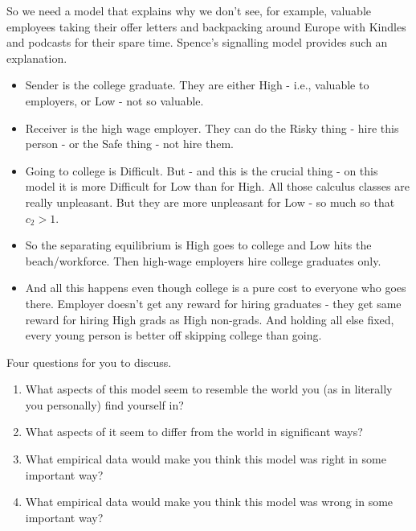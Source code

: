 \documentclass[11pt,]{article}
\providecommand{\tightlist}{%
  \setlength{\itemsep}{0pt}\setlength{\parskip}{0pt}}
\begin{document}
So we need a model that explains why we don't see, for example, valuable
employees taking their offer letters and backpacking around Europe with
Kindles and podcasts for their spare time. Spence's signalling model
provides such an explanation.

\begin{itemize}
\tightlist
\item
  Sender is the college graduate. They are either High - i.e., valuable
  to employers, or Low - not so valuable.
\item
  Receiver is the high wage employer. They can do the Risky thing - hire
  this person - or the Safe thing - not hire them.
\item
  Going to college is Difficult. But - and this is the crucial thing -
  on this model it is more Difficult for Low than for High. All those
  calculus classes are really unpleasant. But they are more unpleasant
  for Low - so much so that \(c_2 > 1\).
\item
  So the separating equilibrium is High goes to college and Low hits the
  beach/workforce. Then high-wage employers hire college graduates only.
\item
  And all this happens even though college is a pure cost to everyone
  who goes there. Employer doesn't get any reward for hiring graduates -
  they get same reward for hiring High grads as High non-grads. And
  holding all else fixed, every young person is better off skipping
  college than going.
\end{itemize}

Four questions for you to discuss.

\begin{enumerate}
\def\labelenumi{\arabic{enumi}.}
\tightlist
\item
  What aspects of this model seem to resemble the world you (as in
  literally you personally) find yourself in?
\item
  What aspects of it seem to differ from the world in significant ways?
\item
  What empirical data would make you think this model was right in some
  important way?
\item
  What empirical data would make you think this model was wrong in some
  important way?
\end{enumerate}
\end{document}
